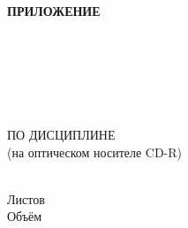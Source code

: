 \begin{ESKDtitlePage}
    \begin{flushright}
        \textbf{ПРИЛОЖЕНИЕ~\gpiPrilLetter} \enspace\enspace
    \end{flushright}
    \begin{center}
        \gpiEdu \\
        \gpiKaf \\
    \end{center}

    \vfill

    \begin{center}
        \gpiTopic \\
    \end{center}

    \vfill

    \begin{center}
        \textbf{\gpiDocTopic} \\
        ПО ДИСЦИПЛИНЕ \gpiDiscipline \\
        (на оптическом носителе CD-R) \\
    \end{center}

    \vfill

    \begin{center}
        \gpiCode \\
        Листов \pageref{LastPage} \\
        Объём~\gpiDiskSize \\
    \end{center}

    \vfill

    

    \vfill

    \begin{center}
        \ESKDtheYear
    \end{center}
\end{ESKDtitlePage}
